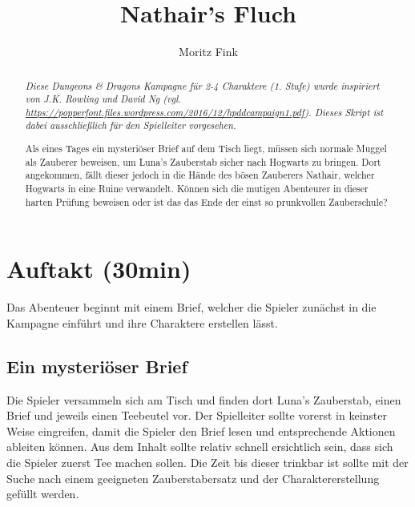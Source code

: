 \documentclass[]{scrartcl}
\title{Nathair's Fluch}
\author{Moritz Fink}
\begin{document}
\maketitle

\begin{abstract}
\textit{
Diese Dungeons \& Dragons Kampagne für 2-4 Charaktere (1. Stufe) wurde inspiriert von J.K. Rowling und David Ng (vgl. \url{https://popperfont.files.wordpress.com/2016/12/hpddcampaign1.pdf}). Dieses Skript ist dabei ausschließlich für den Spielleiter vorgesehen.\\
}

Als eines Tages ein mysteriöser Brief auf dem Tisch liegt, müssen sich normale Muggel als Zauberer beweisen, um Luna's Zauberstab sicher nach Hogwarts zu bringen. Dort angekommen, fällt dieser jedoch in die Hände des bösen Zauberers Nathair, welcher Hogwarts in eine Ruine verwandelt. Können sich die mutigen Abenteurer in dieser harten Prüfung beweisen oder ist das das Ende der einst so prunkvollen Zauberschule?
\end{abstract}

\newpage

\tableofcontents

\newpage

\section{Auftakt (30min)}

Das Abenteuer beginnt mit einem Brief, welcher die Spieler zunächst in die Kampagne einführt und ihre Charaktere erstellen lässt.

\subsection{Ein mysteriöser Brief}

Die Spieler versammeln sich am Tisch und finden dort Luna's Zauberstab, einen Brief und jeweils einen Teebeutel vor. Der Spielleiter sollte vorerst in keinster Weise eingreifen, damit die Spieler den Brief lesen und entsprechende Aktionen ableiten können. Aus dem Inhalt sollte relativ schnell ersichtlich sein, dass sich die Spieler zuerst Tee machen sollen. Die Zeit bis dieser trinkbar ist sollte mit der Suche nach einem geeigneten Zauberstabersatz und der Charaktererstellung gefüllt werden.

\newpage
\end{document}
